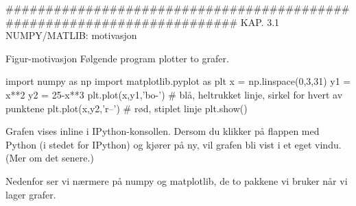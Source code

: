 ######################################################################## 
KAP. 3.1  NUMPY/MATLIB: motivasjon

Figur-motivasjon
Følgende program plotter to grafer. 

import numpy as np
import matplotlib.pyplot as plt   
x = np.linspace(0,3,31)
y1 = x**2
y2 = 25-x**3
plt.plot(x,y1,'bo-')   # blå, heltrukket linje, sirkel for hvert av punktene  
plt.plot(x,y2,'r--')   # rød, stiplet linje
plt.show()

Grafen vises inline i IPython-konsollen.
Dersom du klikker på flappen med Python (i stedet for IPython) og kjører på ny, 
vil grafen bli vist i et eget vindu.
(Mer om det senere.) 

Nedenfor ser vi nærmere på numpy og matplotlib, de to pakkene vi bruker når vi lager grafer. 



